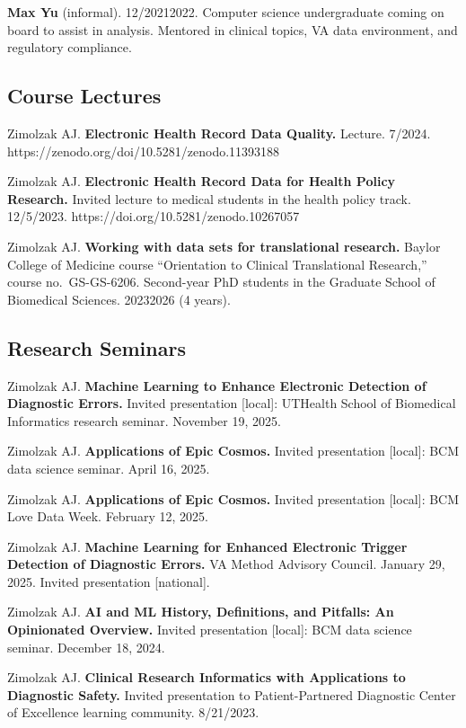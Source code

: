 \documentclass[10pt]{article}
\begin{document}
\textbf{Max Yu} (informal). 12/2021\ndash{}2022. Computer science
undergraduate coming on board to assist in analysis. Mentored in
clinical topics, VA data environment, and regulatory compliance.

\subsection{Course Lectures}  %

Zimolzak AJ. \textbf{Electronic Health Record Data Quality.} Lecture.
7/2024.\\
https://zenodo.org/doi/10.5281/zenodo.11393188

Zimolzak AJ. \textbf{Electronic Health Record Data for Health Policy
  Research.} Invited lecture to medical students in the health policy
track. 12/5/2023. https://doi.org/10.5281/zenodo.10267057

Zimolzak AJ. \textbf{Working with data sets for translational
  research.} Baylor College of Medicine course ``Orientation to
Clinical Translational Research,'' course no.\ GS-GS-6206. Second-year
PhD students in the Graduate School of Biomedical Sciences.
2023\ndash{}2026 (4 years).

\subsection{Research Seminars}  %

Zimolzak AJ. \textbf{Machine Learning to Enhance Electronic Detection
  of Diagnostic Errors.} Invited presentation [local]: UTHealth School
of Biomedical Informatics research seminar. November 19, 2025.

Zimolzak AJ. \textbf{Applications of Epic Cosmos.} Invited
presentation [local]: BCM data science seminar. April 16, 2025.

Zimolzak AJ. \textbf{Applications of Epic Cosmos.} Invited
presentation [local]: BCM Love Data Week. February 12, 2025.

Zimolzak AJ. \textbf{Machine Learning for Enhanced Electronic Trigger
  Detection of Diagnostic Errors.} VA Method Advisory Council. January
29, 2025. Invited presentation [national].

Zimolzak AJ. \textbf{AI and ML History, Definitions, and Pitfalls: An
  Opinionated Overview.} Invited presentation [local]: BCM data
science seminar. December 18, 2024.

Zimolzak AJ. \textbf{Clinical Research Informatics with Applications
  to Diagnostic Safety.} Invited presentation to Patient-Partnered
Diagnostic Center of Excellence learning community. 8/21/2023.
\end{document}
